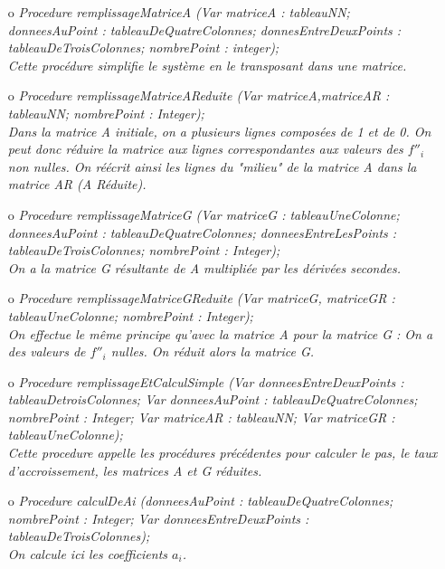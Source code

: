 \documentclass{article}
\begin{document}
\begin{enumerate}
	\item[o] \it Procedure remplissageMatriceA (Var matriceA : tableauNN; donneesAuPoint : tableauDeQuatreColonnes; donnesEntreDeuxPoints : tableauDeTroisColonnes; nombrePoint : integer);\\
	\rm Cette proc\'{e}dure simplifie le syst\`eme en le transposant dans une matrice.\\
	
	\newpage
	\item[o] \it Procedure remplissageMatriceAReduite (Var matriceA,matriceAR : tableauNN; nombrePoint : Integer);\\
	\rm Dans la matrice A initiale, on a plusieurs lignes compos\'{e}es de 1 et de 0. On peut donc r\'{e}duire la matrice aux lignes correspondantes aux valeurs des $f''_{i}$ non nulles. On r\'{e}\'{e}crit ainsi les lignes du "milieu" de la matrice A dans la matrice AR (A R\'{e}duite).\\
	
	\item[o] \it Procedure remplissageMatriceG (Var matriceG : tableauUneColonne; donneesAuPoint : tableauDeQuatreColonnes; donneesEntreLesPoints : tableauDeTroisColonnes; nombrePoint : Integer);\\
	\rm On a la matrice G r\'{e}sultante de A multipli\'{e}e par les d\'{e}riv\'{e}es secondes.\\
	
	\item[o] \it Procedure remplissageMatriceGReduite (Var matriceG, matriceGR : tableauUneColonne; nombrePoint : Integer);\\
	\rm On effectue le m\^eme principe qu'avec la matrice A pour la matrice G : On a des valeurs de $f''_{i}$ nulles. On r\'{e}duit alors la matrice G.\\
	
	\item[o] \it Procedure remplissageEtCalculSimple (Var donneesEntreDeuxPoints : tableauDetroisColonnes; Var donneesAuPoint : tableauDeQuatreColonnes; nombrePoint : Integer; Var matriceAR : tableauNN; Var matriceGR : tableauUneColonne); \\
	\rm Cette procedure appelle les proc\'{e}dures pr\'{e}c\'{e}dentes pour calculer le pas, le taux d'accroissement, les matrices A et G r\'{e}duites.\\
	
	\item[o] \it Procedure calculDeAi (donneesAuPoint : tableauDeQuatreColonnes; nombrePoint : Integer; Var donneesEntreDeuxPoints : tableauDeTroisColonnes);\\
	\rm On calcule ici les coefficients $a_{i}$.\\
	

\end{enumerate}
\end{document}
